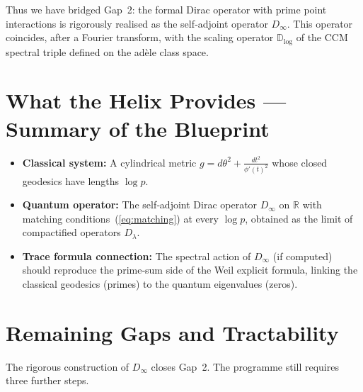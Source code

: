 \documentclass[12pt,a4paper]{article}
\newcommand{\R}{\mathbb{R}}
\begin{document}
Thus we have bridged Gap~2: the formal Dirac operator with prime point interactions is rigorously realised as the self‑adjoint operator \(D_\infty\).  This operator coincides, after a Fourier transform, with the scaling operator \(\mathbb{D}_{\log}\) of the CCM spectral triple defined on the adèle class space.

\section{What the Helix Provides — Summary of the Blueprint}

\begin{itemize}
\item \textbf{Classical system:} A cylindrical metric \(g = d\theta^2 + \frac{dt^2}{\phi'(t)^2}\) whose closed geodesics have lengths \(\log p\).
\item \textbf{Quantum operator:} The self‑adjoint Dirac operator \(D_\infty\) on \(\R\) with matching conditions~(\ref{eq:matching}) at every \(\log p\), obtained as the limit of compactified operators \(D_\lambda\).
\item \textbf{Trace formula connection:} The spectral action of \(D_\infty\) (if computed) should reproduce the prime‑sum side of the Weil explicit formula, linking the classical geodesics (primes) to the quantum eigenvalues (zeros).
\end{itemize}

\section{Remaining Gaps and Tractability}

The rigorous construction of \(D_\infty\) closes Gap~2.  The programme still requires three further steps.
\end{document}
